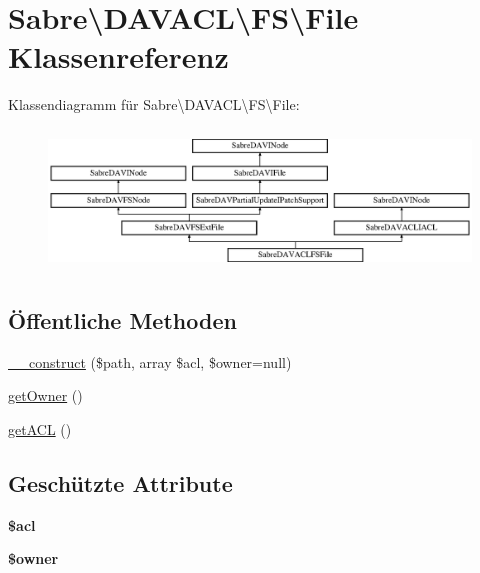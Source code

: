\hypertarget{class_sabre_1_1_d_a_v_a_c_l_1_1_f_s_1_1_file}{}\section{Sabre\textbackslash{}D\+A\+V\+A\+CL\textbackslash{}FS\textbackslash{}File Klassenreferenz}
\label{class_sabre_1_1_d_a_v_a_c_l_1_1_f_s_1_1_file}
Klassendiagramm für Sabre\textbackslash{}D\+A\+V\+A\+CL\textbackslash{}FS\textbackslash{}File\+:\begin{figure}[H]
\begin{center}
\leavevmode
\includegraphics[height=3.778677cm]{class_sabre_1_1_d_a_v_a_c_l_1_1_f_s_1_1_file}
\end{center}
\end{figure}
\subsection*{Öffentliche Methoden}
\begin{DoxyCompactItemize}
\item 
\mbox{\hyperlink{class_sabre_1_1_d_a_v_a_c_l_1_1_f_s_1_1_file_a7036cdf07159b615feb2dcbb86098df0}{\+\_\+\+\_\+construct}} (\$path, array \$acl, \$owner=null)
\item 
\mbox{\hyperlink{class_sabre_1_1_d_a_v_a_c_l_1_1_f_s_1_1_file_aae1b5e16fe8fea6323e590710611f656}{get\+Owner}} ()
\item 
\mbox{\hyperlink{class_sabre_1_1_d_a_v_a_c_l_1_1_f_s_1_1_file_a68a29ed0ebbf5819e2958e7110a572da}{get\+A\+CL}} ()
\end{DoxyCompactItemize}
\subsection*{Geschützte Attribute}
\begin{DoxyCompactItemize}
\item 
\mbox{\label{class_sabre_1_1_d_a_v_a_c_l_1_1_f_s_1_1_file_a878744e06a825f2e6daa39000727297e}} 
{\bfseries \$acl}
\item 
\mbox{\label{class_sabre_1_1_d_a_v_a_c_l_1_1_f_s_1_1_file_a5573492a2afc59bfc907581b9b5629d1}} 
{\bfseries \$owner}
\end{DoxyCompactItemize}


